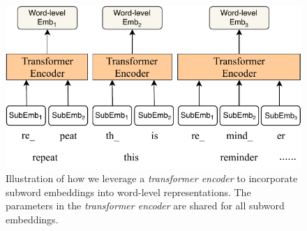 \documentclass[letterpaper]{article} %
\begin{document}
\begin{figure}
    \centering
    \includegraphics[scale=0.67]{subword2word.pdf}
    \caption{Illustration of how we leverage a \textit{transformer encoder} to incorporate subword embeddings into word-level representations. The parameters in the \textit{transformer encoder} are shared for all subword embeddings.}
    \label{fig:subword2word}
\end{figure}
\end{document}
